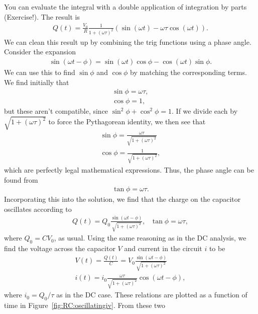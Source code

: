 You can evaluate the integral with a double application of integration by 
parts (Exercise!). The result is
\begin{eqnarray*}
Q(t) = \frac{V_0}{R} \frac{1}{1+(\omega \tau)^2} \left( \sin (\omega t) -
       \omega \tau \cos(\omega t) \right).
\end{eqnarray*}  
We can clean this result up by combining the trig functions using a phase 
angle. Consider the expansion
\begin{eqnarray*}
\sin(\omega t - \phi) = \sin(\omega t) \cos\phi - \cos(\omega t) \sin\phi.
\end{eqnarray*}
We can use this to find $\sin\phi$ and $\cos\phi$ by matching the corresponding
terms. We find initially that
\begin{eqnarray*}
\sin\phi = \omega \tau,\\
\cos\phi = 1,
\end{eqnarray*}
but these aren't compatible, since $\sin^2 \phi + \cos^2 \phi =1$. If we 
divide each by $\sqrt{1+(\omega \tau)^2}$ to force the Pythagorean identity, we
then see that
\begin{eqnarray*}
\sin\phi = \frac{\omega \tau}{\sqrt{1+(\omega \tau)^2}}\\
\cos\phi = \frac{1}{\sqrt{1+(\omega \tau)^2}}, 
\end{eqnarray*}
which are perfectly legal mathematical expressions. Thus, the phase angle can
be found from
\begin{eqnarray}
\tan \phi = \omega \tau.\label{eq:RC:phaseangle}
\end{eqnarray}
Incorporating this into the solution, we find that the charge on the capacitor
oscillates according to
\begin{eqnarray*}
Q(t) = Q_0 \frac{\sin(\omega t - \phi)}{\sqrt{1+(\omega \tau)^2}},
~~~\tan\phi=\omega\tau,    
\end{eqnarray*}
where $Q_0 = CV_0$, as usual. Using the same reasoning as in the DC analysis, 
we find the voltage across the capacitor $V$ and current in the circuit $i$ to 
be
\begin{eqnarray}
V(t) = \frac{Q(t)}{C} = V_0 \frac{\sin(\omega t - \phi)}
        {\sqrt{1+(\omega \tau)^2}}
       \label{eq:RC:oscillatingv}\\
i(t) = i_0\frac{\omega \tau}{\sqrt{1+(\omega \tau)^2}} 
       \cos(\omega t - \phi),
       \nonumber
\end{eqnarray}
where $i_0=Q_0/\tau$ as in the DC case. These relations are plotted as a 
function of time in Figure~\ref{fig:RC:oscillatingiv}. From these two 
